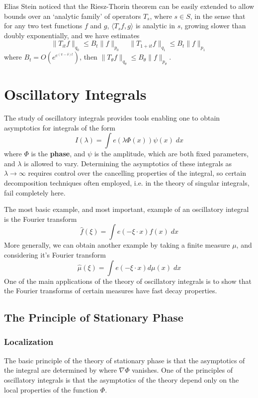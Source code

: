 Elias Stein noticed that the Riesz-Thorin theorem can be easily extended to allow bounds over an `analytic family' of operators $T_s$, where $s \in S$, in the sense that for any two test functions $f$ and $g$, $\langle T_s f, g \rangle$ is analytic in $s$, growing slower than doubly exponentially, and we have estimates
%
\[ \| T_{it} f \|_{q_0} \leq B_t \| f \|_{p_0}\ \ \ \ \ \| T_{1+it} f \|_{q_1} \leq B_t \| f \|_{p_1} \]
%
where $B_t = O(e^{e^{(\pi - \delta)t}})$, then $\| T_\theta f \|_{q_\theta} \leq B_\theta \| f \|_{p_\theta}$.

\chapter{Oscillatory Integrals}

The study of oscillatory integrals provides tools enabling one to obtain asymptotics for integrals of the form
%
\[ I(\lambda) = \int e(\lambda \Phi(x)) \psi(x)\; dx \]
%
where $\Phi$ is the {\bf phase}, and $\psi$ is the amplitude, which are both fixed parameters, and $\lambda$ is allowed to vary. Determining the asymptotics of these integrals as $\lambda \to \infty$ requires control over the cancelling properties of the integral, so certain decomposition techniques often employed, i.e. in the theory of singular integrals, fail completely here.

\begin{example}
	The most basic example, and most important, example of an oscillatory integral is the Fourier transform
	\[ \widehat{f}(\xi) = \int e(-\xi \cdot x) f(x)\; dx \]
	More generally, we can obtain another example by taking a finite measure $\mu$, and considering it's Fourier transform
	\[ \widehat{\mu}(\xi) = \int e(- \xi \cdot x) d\mu(x)\; dx \]
	One of the main applications of the theory of oscillatory integrals is to show that the Fourier transforms of certain measures have fast decay properties.
\end{example}

\section{The Principle of Stationary Phase}

\subsection{Localization}

The basic principle of the theory of stationary phase is that the asymptotics of the integral are determined by where $\nabla \Phi$ vanishes. One of the principles of oscillatory integrals is that the asymptotics of the theory depend only on the local properties of the function $\Phi$.


